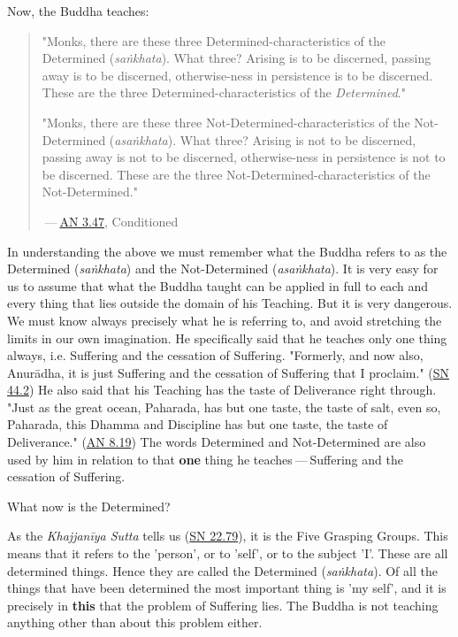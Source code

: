 Now, the Buddha teaches:

\begin{quote}
"Monks, there are these three Determined-characteristics of the Determined (\emph{saṅkhata}). What three? Arising is to be discerned, passing away is to be discerned, otherwise-ness in persistence is to be discerned. These are the three Determined-characteristics of the \emph{Determined}."

"Monks, there are these three Not-Determined-characteristics of the Not-Determined (\emph{asaṅkhata}). What three? Arising is not to be discerned, passing away is not to be discerned, otherwise-ness in persistence is not to be discerned. These are the three Not-Determined-characteristics of the Not-Determined."

 --- \href{https://suttacentral.net/an3.47/en/bodhi}{AN 3.47}, Conditioned
\end{quote}

In understanding the above we must remember what the Buddha refers to as the Determined (\emph{saṅkhata}) and the Not-Determined (\emph{asaṅkhata}). It is very easy for us to assume that what the Buddha taught can be applied in full to each and every thing that lies outside the domain of his Teaching. But it is very dangerous. We must know always precisely what he is referring to, and avoid stretching the limits in our own imagination. He specifically said that he teaches only one thing always, i.e. Suffering and the cessation of Suffering. "Formerly, and now also, Anurādha, it is just Suffering and the cessation of Suffering that I proclaim." (\href{https://suttacentral.net/sn44.2/en/sujato}{SN 44.2}) He also said that his Teaching has the taste of Deliverance right through. "Just as the great ocean, Paharada, has but one taste, the taste of salt, even so, Paharada, this Dhamma and Discipline has but one taste, the taste of Deliverance." (\href{https://suttacentral.net/an8.19/en/bodhi}{AN 8.19}) The words Determined and Not-Determined are also used by him in relation to that \textbf{one} thing he teaches --- Suffering and the cessation of Suffering.

What now is the Determined?

As the \emph{Khajjanīya Sutta} tells us (\href{https://suttacentral.net/sn22.79/en/bodhi}{SN 22.79}), it is the Five Grasping Groups. This means that it refers to the 'person', or to 'self', or to the subject 'I'. These are all determined things. Hence they are called the Determined (\emph{saṅkhata}). Of all the things that have been determined the most important thing is 'my self', and it is precisely in \textbf{this} that the problem of Suffering lies. The Buddha is not teaching anything other than about this problem either.

